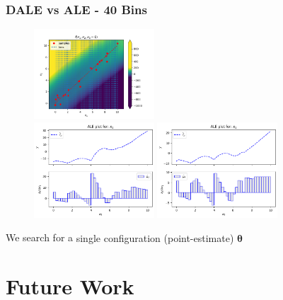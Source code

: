 \documentclass{beamer}
\newcommand{\thetab}{\boldsymbol{\theta}}
\begin{document}
\begin{frame}
  \frametitle{DALE vs ALE - 40 Bins}
  \begin{figure}[ht]
    \centering
    \includegraphics[width=0.4\textwidth]{./figures/bin_splitting_40_bins.png}\\
    \includegraphics[width=0.4\textwidth]{./figures/dale_40_bins.png}
    \includegraphics[width=0.4\textwidth]{./figures/ale_40_bins.png}
    \label{}
  \end{figure}
  \noindent\makebox[\linewidth]{\rule{\paperwidth}{0.4pt}}
  We search for a \alert{single configuration (point-estimate) \( \hat{\thetab}\) }
\end{frame}

\section{Future Work}
\end{document}
